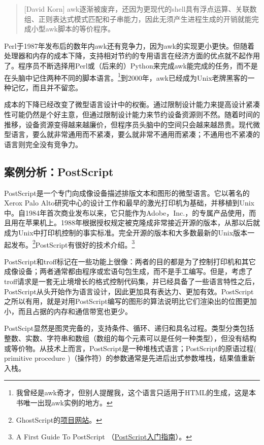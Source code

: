\documentclass[12pt,oneside]{book}
\begin{document}
\begin{common-format}
\begin{quote}[David Korn]
awk逐渐被废弃，还因为更现代的shell具有浮点运算、关联数组、正则表达式模式匹配和子串能力，因此无须产生进程生成的开销就能完成小型awk脚本的等价程序。
\end{quote}

Perl于1987年发布后的数年内awk还有竞争力，因为awk的实现更小更快。但随着处理器和内存的成本下降，支持相对节约的专用语言在经济方面的优点就不起作用了。程序员不断选择用Perl或（后来的）Python来完成awk能完成的任务，而不是在头脑中记住两种不同的脚本语言。\footnote{我曾经是awk奇才，但别人提醒我，这个语言只适用于HTML的生成，这是本书唯一出现awk实例的地方。}到2000年，awk已经成为Unix老牌黑客的一种记忆，而且并不留恋。

成本的下降已经改变了微型语言设计中的权衡。通过限制设计能力来提高设计紧凑性可能仍然是个好主意，但通过限制设计能力来节约设备资源则不然。随着时间的推移，设备资源变得越来越廉价，但程序员头脑中的空间只会越来越昂贵。现代微型语言，要么就非常通用而不紧凑，要么就非常不通用而紧凑；不通用也不紧凑的语言则完全没有竞争力。


\subsection{案例分析：PostScript}
PostScript是一个专门向成像设备描述排版文本和图形的微型语言。它以著名的Xerox Palo Alto研究中心的设计工作和最早的激光打印机为基础，并移植到Unix中。自1984年首次商业发布以来，它只能作为Adobe，Inc.，的专属产品使用，而且用在苹果机上。1988年根据授权规定被克隆成非常接近开源的版本，从那以后就成为Unix中打印机控制的事实标准。完全开源的版本和大多数最新的Unix版本一起发布。\footnote{GhostScript的\href{http://pages.cs.wisc.edu/~ghost/}{项目网站}。}PostScript有很好的技术介绍。\footnote{A First Guide To PostScript （\href{http://www.tailrecursive.org/postscript/postscript.html}{PostScript入门指南}）。}

PostScript和troff标记在一些功能上很像：两者的目的都是为了控制打印机和其它成像设备；两者通常都由程序或宏语句包生成，而不是手工编写。但是，考虑了troff请求是一套无止境增长的格式控制代码集，并已经具备了一些语言特性之后，PostScript从头开始作为语言设计，因此更加具有表达力、更加有效。PostScript之所以有用，就是对用PostScript编写的图形的算法说明比它们渲染出的位图更加小，而且占据的内存和通信带宽也更少。

PostScipt显然是图灵完备的，支持条件、循环、递归和具名过程。类型分类包括整数、实数、字符串和数组（数组的每个元素可以是任何一种类型），但没有结构或等价物。从技术上而言，PostScript是一种堆栈式语言；PostScript的原语过程( primitive procedure )（操作符）的参数通常是先进后出式参数堆栈，结果值重新入栈。


\end{common-format}
\end{document}
